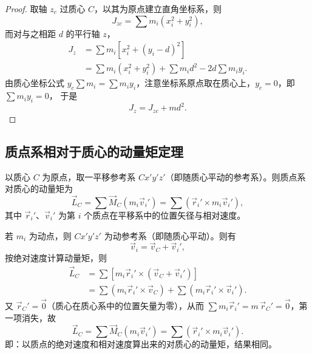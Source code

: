 \begin{proof}
取轴 $z_c$ 过质心 $C$，以其为原点建立直角坐标系，则
\begin{equation}\label{eq:12-parallel-jzc}
  J_{zc}=\sum m_i(x_i^2+y_i^2),
\end{equation}
而对与之相距 $d$ 的平行轴 $z$，
\begin{equation}\label{eq:12-parallel-expand}
\begin{aligned}
  J_z&=\sum m_i\left[x_i^2+(y_i-d)^2\right]\\
  &=\sum m_i(x_i^2+y_i^2)+\sum m_i d^2-2d\sum m_i y_i.
\end{aligned}
\end{equation}
由质心坐标公式 $y_c\sum m_i=\sum m_i y_i$，注意坐标系原点取在质心上，$y_c=0$，即 $\sum m_i y_i=0$，
于是
\begin{equation}\label{eq:12-parallel-result}
  J_z=J_{zc}+md^2.
\end{equation}
\end{proof}

\subsection{质点系相对于质心的动量矩定理}

以质心 $C$ 为原点，取一平移参考系 $Cx'y'z'$（即随质心平动的参考系）。则质点系对质心的动量矩为
\begin{equation}\label{eq:12-lc-def}
  \vec{L}_C=\sum\vec{M}_C(m_i\vec{v}_i')
  =\sum\left(\vec{r}_i'\times m_i\vec{v}_i'\right),
\end{equation}
其中 $\vec{r}_i'$、$\vec{v}_i'$ 为第 $i$ 个质点在平移系中的位置矢径与相对速度。

若 $m_i$ 为动点，则 $Cx'y'z'$ 为动参考系（即随质心平动）。则有
\begin{equation}\label{eq:12-vi-decomp}
  \vec{v}_i=\vec{v}_C+\vec{v}_i',
\end{equation}
按绝对速度计算动量矩，则
\begin{equation}\label{eq:12-lc-split}
\begin{aligned}
  \vec{L}_C
  &=\sum\left[m_i\vec{r}_i'\times\left(\vec{v}_C+\vec{v}_i'\right)\right]\\
  &=\sum\left(m_i\vec{r}_i'\times\vec{v}_C\right)
    +\sum\left(m_i\vec{r}_i'\times\vec{v}_i'\right).
\end{aligned}
\end{equation}
又 $\vec{r}_C'=\vec{0}$（质心在质心系中的位置矢量为零），从而 $\sum m_i\vec{r}_i'=m\,\vec{r}_C'=\vec{0}$，第一项消失，故
\begin{equation}\label{eq:12-lc-relative}
  \vec{L}_C=\sum\vec{M}_C(m_i\vec{v}_i')=\sum\left(\vec{r}_i'\times m_i\vec{v}_i'\right).
\end{equation}
即：以质点的绝对速度和相对速度算出来的对质心的动量矩，结果相同。

